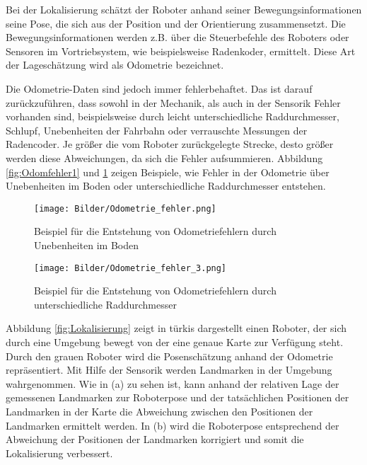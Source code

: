Bei der Lokalisierung schätzt der Roboter anhand seiner Bewegungsinformationen seine Pose, die sich aus der Position und der Orientierung zusammensetzt. Die Bewegungsinformationen werden z.B. über die Steuerbefehle des Roboters oder Sensoren im Vortriebsystem, wie beispielsweise Radenkoder, ermittelt. Diese Art der La\-ge\-schät\-zung wird als Odometrie bezeichnet. 

Die Odometrie-Daten sind jedoch immer fehlerbehaftet. Das ist darauf zurückzuführen, dass sowohl in der Mechanik, als auch in der Sensorik Fehler vorhanden sind, beispielsweise durch leicht unterschiedliche Raddurchmesser, Schlupf, Unebenheiten der Fahrbahn oder verrauschte Messungen der Radencoder. Je größer die vom Roboter zurückgelegte Strecke, desto größer werden diese Abweichungen, da sich die Fehler aufsummieren.  Abbildung \ref{fig:Odomfehler1} und \ref{fig:Odomfehler2} zeigen Beispiele, wie Fehler in der Odometrie über Unebenheiten im Boden oder unterschiedliche Raddurchmesser entstehen. 

\begin{figure}
	\centering
	\begin{minipage}[t]{0.7\linewidth}
		\centering
		\texttt{[image: Bilder/Odometrie\_fehler.png]}
		\caption{Beispiel für die Entstehung von Odometriefehlern durch Unebenheiten im Boden}
		\label{fig:Odomfehler1}
	\end{minipage}
	\hfill
	\begin{minipage}[t]{0.25\linewidth}
		\centering
		\texttt{[image: Bilder/Odometrie\_fehler\_3.png]}
		\caption{Beispiel für die Entstehung von Odometriefehlern durch unterschiedliche Raddurchmesser}
		\label{fig:Odomfehler2}
	\end{minipage}
\end{figure}

Abbildung \ref{fig:Lokalisierung} zeigt in türkis dargestellt einen Roboter, der sich durch eine Umgebung bewegt von der eine genaue Karte zur Verfügung steht. Durch den grauen Roboter wird die Posenschätzung anhand der Odometrie repräsentiert. Mit Hilfe der Sensorik werden Landmarken in der Umgebung wahrgenommen. Wie in (a) zu sehen ist, kann anhand der relativen Lage der gemessenen Landmarken zur Roboterpose und der tatsächlichen Positionen der Landmarken in der Karte die Abweichung zwischen den Positionen der Landmarken ermittelt werden. In (b) wird die Roboterpose entsprechend der Abweichung der Positionen der Landmarken korrigiert und somit die Lokalisierung verbessert. 

